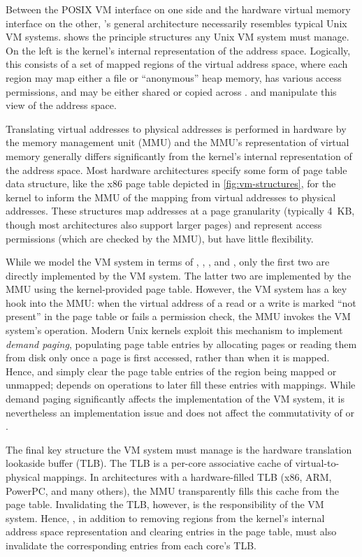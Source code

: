 Between the POSIX VM interface on one side and the hardware virtual
memory interface on the other, \vm's general architecture necessarily
resembles typical Unix VM systems.   shows the
principle structures any Unix VM system must manage.  On the left is
the kernel's internal representation of the address space.  Logically,
this consists of a set of mapped regions of the virtual address space,
where each region may map either a file or ``anonymous'' heap
memory, has various access permissions, and may be either shared or
copied across .   and 
manipulate this view of the address space.

Translating virtual addresses to physical addresses is
performed in hardware by the memory
management unit (MMU) and the MMU's representation of virtual memory
generally differs significantly from the kernel's internal
representation of the address space.  Most hardware architectures
specify some form of page table data structure, like the x86 page
table depicted in
\cref{fig:vm-structures}, for the kernel to inform the MMU of the
mapping from virtual addresses to physical addresses.  These
structures map addresses at a page granularity (typically 4~KB, though
most architectures also support larger pages) and represent access
permissions (which are checked by the MMU), but have little
flexibility.

While we model the VM system in terms of , ,
, and , only the first two are directly
implemented by the VM system.  The latter two are implemented by the
MMU using the kernel-provided page table.  However, the VM system has
a key hook into the MMU: when the virtual address of a read or a write
is marked ``not present'' in the page table or fails a permission
check, the MMU invokes the VM system's  operation.
Modern Unix kernels exploit this mechanism to implement \emph{demand
  paging}, populating page table entries by allocating pages or
reading them from disk only once a page is first accessed, rather than
when it is mapped.
%
Hence,  and  simply clear the page table
entries of the region being mapped or unmapped;  depends on
 operations to later fill these entries with mappings.
%
While demand paging significantly affects the implementation of the VM
system, it is nevertheless an implementation issue and does not affect
the commutativity of  or .

The final key structure the VM system must manage is the hardware
translation lookaside buffer (TLB).  The TLB is a per-core associative
cache of virtual-to-physical mappings.  In architectures with a
hardware-filled TLB (x86, ARM, PowerPC, and many others), the MMU
transparently fills this cache from the page table.  Invalidating the
TLB, however, is the responsibility of the VM system.  Hence,
, in addition to removing regions from the kernel's
internal address space representation and clearing entries in the page
table, must also invalidate the corresponding entries from each core's
TLB.


